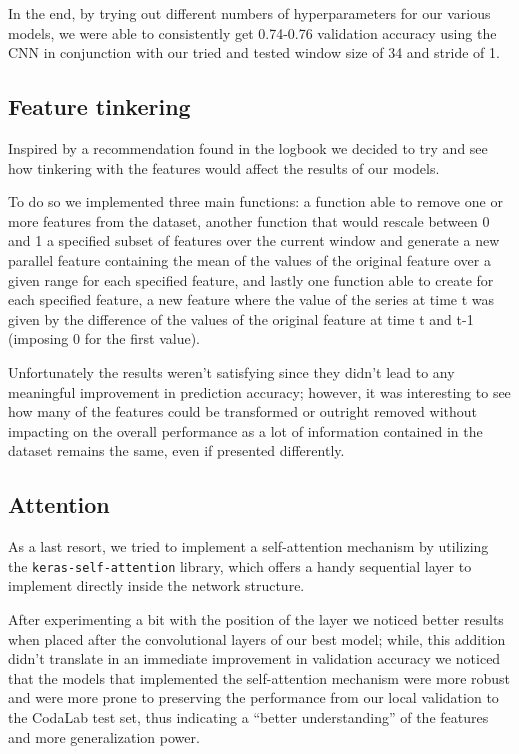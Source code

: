 \documentclass[11pt]{report}
\begin{document}
In the end, by trying out different numbers of hyperparameters for our various models, we were able to consistently get 0.74-0.76 validation accuracy using the CNN in conjunction with our tried and tested window size of 34 and stride of 1.

\subsection{Feature tinkering}
Inspired by a recommendation found in the logbook we decided to try and see how tinkering with the features would affect the results of our models.

To do so we implemented three main functions: a function able to remove one or more features from the dataset, another function that would rescale between 0 and 1 a specified subset of features over the current window and generate a new parallel feature containing the mean of the values of the original feature over a given range for each specified feature, and lastly one function able to create for each specified feature, a new feature where the value of the series at time t was given by the difference of the values of the original feature at time t and t-1 (imposing 0 for the first value).

Unfortunately the results weren’t satisfying since they didn’t lead to any meaningful improvement in prediction accuracy; however, it was interesting to see how many of the features could be transformed or outright removed without impacting on the overall performance as a lot of information contained in the dataset remains the same, even if presented differently.

\subsection{Attention}
As a last resort, we tried to implement a self-attention mechanism by utilizing the \texttt{keras-self-attention} library, which offers a handy sequential layer to implement directly inside the network structure.

After experimenting a bit with the position of the layer we noticed better results when placed after the convolutional layers of our best model; while, this addition didn’t translate in an immediate improvement in validation accuracy we noticed that the models that implemented the self-attention mechanism were more robust and were more prone to preserving the performance from our local validation to the CodaLab test set, thus indicating a “better understanding” of the features and more generalization power.
\end{document}
